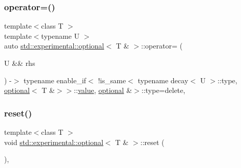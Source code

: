 \mbox{\label{classstd_1_1experimental_1_1optional_3_01_t_01_6_01_4_aa0784b03df926b6eb712d1af5d7a7c24}} 
\subsubsection{\texorpdfstring{operator=()}{operator=()}\hspace{0.1cm}{\footnotesize\ttfamily [3/3]}}
{\footnotesize\ttfamily template$<$class T $>$ \\
template$<$typename U $>$ \\
auto \mbox{\hyperlink{classstd_1_1experimental_1_1optional}{std\+::experimental\+::optional}}$<$ T \& $>$\+::operator= (\begin{DoxyParamCaption}\item[{U \&\&}]{rhs }\end{DoxyParamCaption}) -\/$>$  typename enable\+\_\+if$<$ !is\+\_\+same$<$ typename decay$<$ U $>$\+::type, \mbox{\hyperlink{classstd_1_1experimental_1_1optional}{optional}}$<$ T \&$>$$>$\+::\mbox{\hyperlink{classstd_1_1experimental_1_1optional_ad1277f09c288255dfe102b72e7107be6}{value}}, \mbox{\hyperlink{classstd_1_1experimental_1_1optional}{optional}} \&$>$\+::type=delete\hspace{0.3cm}{\ttfamily [delete]}, {\ttfamily [noexcept]}}

\mbox{\label{classstd_1_1experimental_1_1optional_3_01_t_01_6_01_4_a88cda3166b485696833779d31342719c}} 
\subsubsection{\texorpdfstring{reset()}{reset()}}
{\footnotesize\ttfamily template$<$class T $>$ \\
void \mbox{\hyperlink{classstd_1_1experimental_1_1optional}{std\+::experimental\+::optional}}$<$ T \& $>$\+::reset (\begin{DoxyParamCaption}{ }\end{DoxyParamCaption})\hspace{0.3cm}{\ttfamily [inline]}, {\ttfamily [noexcept]}}


